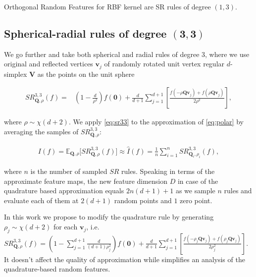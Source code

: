 \begin{proposition}
Orthogonal Random Features for RBF kernel are SR rules of degree $(1, 3)$.
\end{proposition}

\subsection{Spherical-radial rules of degree $\boldsymbol{(3, 3)}$} We go further and take both spherical and radial rules of degree 3, where we use original and reflected vertices $\mathbf{v}_j$ of randomly rotated unit vertex regular $d$-simplex $\mathbf{V}$ as the points on the unit sphere

\begin{equation}
\begin{split}
\label{eq:sr33}
SR^{3,3}_{\mathbf{Q}, \rho}(f) = &\left (1 - \frac{d}{\rho^2} \right )f(\mathbf{0}) + \frac{d}{d+1}\sum\limits_{j=1}^{d+1} \left[ \frac{f(-\rho \mathbf{Qv}_j) + f(\rho \mathbf{Qv}_j)}{2\rho^2} \right],
\end{split}
\end{equation}

where  ${\rho \sim \chi(d+2)}$. We apply \eqref{eq:sr33} to the approximation of \eqref{eq:polar}
by averaging the samples of $SR^{3,3}_{\mathbf{Q}, \rho}$:

\begin{equation}
\begin{split}
\label{eq:estimate}
	I(f) = \mathbb{E}_{\mathbf{Q}, \rho} \lbrack SR^{3,3}_{\mathbf{Q},\rho}(f) \rbrack \approx \hat{I}(f) = \frac{1}{n}\sum\limits_{i=1}^{n} SR^{3,3}_{\mathbf{Q}_i,\rho_i}(f),
\end{split}
\end{equation}

where $n$ is the number of sampled $SR$ rules. Speaking in terms of the approximate feature maps, the new feature dimension $D$ in case of the quadrature based approximation equals $2n(d+1) + 1$ as we sample $n$ rules and evaluate each of them at $2(d+1)$ random points and $1$ zero point.

In this work we propose to modify the quadrature rule by generating $\rho_j \sim \chi(d + 2)$ for each $\mathbf{v}_j$, i.e.
$SR^{3,3}_{\mathbf{Q}, \rho}(f) = \left (1 - \sum_{j = 1}^{d + 1}\frac{d}{(d + 1)\rho_j^2} \right )f(\mathbf{0}) + \frac{d}{d+1}\sum\limits_{j=1}^{d+1} \left[ \frac{f(-\rho_j \mathbf{Qv}_j) + f(\rho_j \mathbf{Qv}_j)}{2\rho_j^2} \right].$
It doesn't affect the quality of approximation while simplifies an analysis of the quadrature-based random features.

